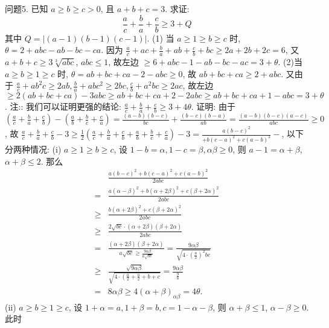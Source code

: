 问题5. 已知 $a \geqslant b \geqslant c>0$, 且 $a+b+c=3$. 求证:
$$
\frac{a}{c}+\frac{b}{a}+\frac{c}{b} \geqslant 3+Q
$$
其中 $Q=|(a-1)(b-1)(c-1)|$.
(1) 当 $a \geqslant 1 \geqslant b \geqslant c$ 时, $\theta=2+a b c-a b-b c-c a$.
因为 $\frac{a}{c}+a c+\frac{b}{a}+a b+\frac{c}{b}+b c \geqslant 2 a+2 b+2 c=6$, 又 $a+b+c \geqslant 3 \sqrt[3]{a b c}$, $a b c \leqslant 1$, 故左边 $\geqslant 6+a b c-1-a b-b c-a c=3+\theta$.
(2)当 $a \geqslant b \geqslant 1 \geqslant c$ 时, $\theta=a b+b c+c a-2-a b c \geqslant 0$, 故 $a b+b c+c a \geqslant 2+a b c$.
又由于 $\frac{a}{c}+a b^2 c \geqslant 2 a b, \frac{b}{a}+a b c^2 \geqslant 2 b c, \frac{c}{b}+a^2 b c \geqslant 2 a c$, 故左边 $\geqslant 2(a b+b c+c a)-3 a b c \geqslant a b+b c+c a+2-2 a b c \geqslant a b+b c+c a+1-a b c= 3+\theta$.
注:: 我们可以证明更强的结论: $\frac{a}{c}+\frac{b}{a}+\frac{c}{b} \geqslant 3+4 \theta$.
证明: 由于 $\left(\frac{a}{c}+\frac{b}{a}+\frac{c}{b}\right)-\left(\frac{a}{b}+\frac{b}{c}+\frac{c}{a}\right)=\frac{(a-b)(b-c)}{b c}+ \frac{(b-c)(b-a)}{a b}=\frac{(a-b)(b-c)(a-c)}{a b c} \geqslant 0$,
故 $\frac{a}{c}+\frac{b}{a}+\frac{c}{b}-3 \geqslant \frac{1}{2}\left(\frac{a}{c}+\frac{b}{a}+\frac{c}{b}+\frac{a}{b}+\frac{b}{c}+\frac{c}{a}\right)-3=\frac{a(b-c)^2}{+b(c-a)^2+c(a-b)^2}-$, 以下分两种情况:
(i) $a \geqslant 1 \geqslant b \geqslant c$, 设 $1-b=\alpha, 1-c=\beta, \alpha \beta \geqslant 0$, 则 $a-1=\alpha+\beta$, $\alpha+\beta \leqslant 2$. 那么
$$
\begin{aligned}
& \frac{a(b-c)^2+b(c-a)^2+c(a-b)^2}{2 a b c} \\
= & \frac{a(\alpha-\beta)^2+b(\alpha+2 \beta)^2+c(\beta+2 \alpha)^2}{2 a b c} \\
\geqslant & \frac{b(\alpha+2 \beta)^2+c(\beta+2 \alpha)^2}{2 a b c} \\
\geqslant & \frac{2 \sqrt{b c} \cdot(\alpha+2 \beta)(\beta+2 \alpha)}{2 a b c} \\
= & \frac{(\alpha+2 \beta)(\beta+2 \alpha)}{a \sqrt{b c} \geqslant \frac{9 \alpha \beta}{a \sqrt{b c}}}=\frac{9 \alpha \beta}{\sqrt{4 \cdot\left(\frac{a}{2}\right)^2 b c}} \\
\geqslant & \frac{\sqrt{9 \alpha \beta}}{\sqrt{4 \cdot\left(\frac{a}{2}+\frac{a}{2}+b+c\right.}}=\frac{9 \alpha \beta}{\frac{9}{8}} \\
= & 8 \alpha \beta \geqslant 4(\alpha+\beta)_{\alpha \beta}=4 \theta .
\end{aligned}
$$
(ii) $a \geqslant b \geqslant 1 \geqslant c$, 设 $1+\alpha=a, 1+\beta=b, c=1-\alpha-\beta$, 则 $\alpha+\beta \leqslant 1$, $\alpha-\beta \geqslant 0$. 此时
